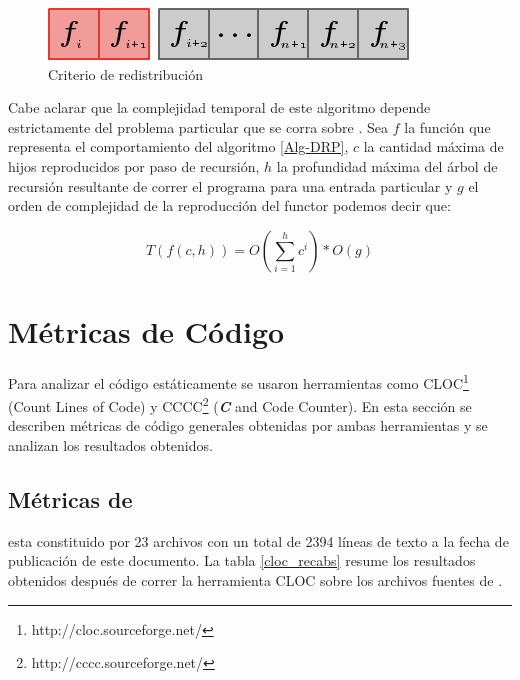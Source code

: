         \begin{figure}[!ht]
            \begin{center}
                \includegraphics[scale=0.6]{images/DRP-Alg-3.png}
            \end{center}
            \caption{Criterio de redistribución}
        \end{figure}

    Cabe aclarar que la complejidad temporal de este algoritmo depende estrictamente del problema particular que se
    corra sobre \rc{}. Sea $f$ la función que representa el comportamiento del algoritmo \ref{Alg-DRP}, $c$ la cantidad máxima de hijos
reproducidos por paso de recursión, $h$ la profundidad máxima del árbol
    de recursión resultante de correr el programa para una entrada particular y $g$ el orden de complejidad de la
    reproducción del functor podemos decir que:

    \begin{table}[ht]
        \begin{center}
        $$T(f(c,h)) = O(\displaystyle\sum\limits_{i=1}^{h} {c^i})*O(g)$$
        \end{center}
    \end{table}

\section{Métricas de Código}

Para analizar el código estáticamente se usaron herramientas como CLOC\footnote{http://cloc.sourceforge.net/} (Count Lines of Code) y
CCCC\footnote{http://cccc.sourceforge.net/} (\textbf{\textit{C}} and \cpp{} Code Counter). En esta sección se describen métricas de
código generales obtenidas por ambas herramientas y se analizan los resultados obtenidos.

\subsection{Métricas de \rc}
\label{recabs_metrics}

\rc{} esta constituido por 23 archivos con un total de 2394 líneas de texto a la fecha de publicación de este documento. La tabla
\ref{cloc_recabs} resume los resultados obtenidos después de correr la herramienta CLOC sobre los archivos fuentes de \rc.

